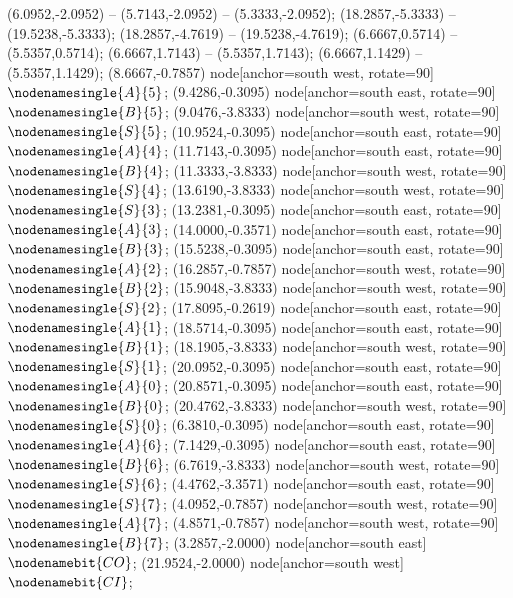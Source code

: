    (6.0952,-2.0952) -- (5.7143,-2.0952) -- (5.3333,-2.0952);
   (18.2857,-5.3333) -- (19.5238,-5.3333);
   (18.2857,-4.7619) -- (19.5238,-4.7619);
   (6.6667,0.5714) -- (5.5357,0.5714);
   (6.6667,1.7143) -- (5.5357,1.7143);
   (6.6667,1.1429) -- (5.5357,1.1429);
   (8.6667,-0.7857) node[anchor=south west, rotate=90] {$\nodenamesingle{A}{5}$};
   (9.4286,-0.3095) node[anchor=south east, rotate=90] {$\nodenamesingle{B}{5}$};
   (9.0476,-3.8333) node[anchor=south west, rotate=90] {$\nodenamesingle{S}{5}$};
   (10.9524,-0.3095) node[anchor=south east, rotate=90] {$\nodenamesingle{A}{4}$};
   (11.7143,-0.3095) node[anchor=south east, rotate=90] {$\nodenamesingle{B}{4}$};
   (11.3333,-3.8333) node[anchor=south west, rotate=90] {$\nodenamesingle{S}{4}$};
   (13.6190,-3.8333) node[anchor=south west, rotate=90] {$\nodenamesingle{S}{3}$};
   (13.2381,-0.3095) node[anchor=south east, rotate=90] {$\nodenamesingle{A}{3}$};
   (14.0000,-0.3571) node[anchor=south east, rotate=90] {$\nodenamesingle{B}{3}$};
   (15.5238,-0.3095) node[anchor=south east, rotate=90] {$\nodenamesingle{A}{2}$};
   (16.2857,-0.7857) node[anchor=south west, rotate=90] {$\nodenamesingle{B}{2}$};
   (15.9048,-3.8333) node[anchor=south west, rotate=90] {$\nodenamesingle{S}{2}$};
   (17.8095,-0.2619) node[anchor=south east, rotate=90] {$\nodenamesingle{A}{1}$};
   (18.5714,-0.3095) node[anchor=south east, rotate=90] {$\nodenamesingle{B}{1}$};
   (18.1905,-3.8333) node[anchor=south west, rotate=90] {$\nodenamesingle{S}{1}$};
   (20.0952,-0.3095) node[anchor=south east, rotate=90] {$\nodenamesingle{A}{0}$};
   (20.8571,-0.3095) node[anchor=south east, rotate=90] {$\nodenamesingle{B}{0}$};
   (20.4762,-3.8333) node[anchor=south west, rotate=90] {$\nodenamesingle{S}{0}$};
   (6.3810,-0.3095) node[anchor=south east, rotate=90] {$\nodenamesingle{A}{6}$};
   (7.1429,-0.3095) node[anchor=south east, rotate=90] {$\nodenamesingle{B}{6}$};
   (6.7619,-3.8333) node[anchor=south west, rotate=90] {$\nodenamesingle{S}{6}$};
   (4.4762,-3.3571) node[anchor=south east, rotate=90] {$\nodenamesingle{S}{7}$};
   (4.0952,-0.7857) node[anchor=south west, rotate=90] {$\nodenamesingle{A}{7}$};
   (4.8571,-0.7857) node[anchor=south west, rotate=90] {$\nodenamesingle{B}{7}$};
   (3.2857,-2.0000) node[anchor=south east] {$\nodenamebit{CO}$};
   (21.9524,-2.0000) node[anchor=south west] {$\nodenamebit{CI}$};
